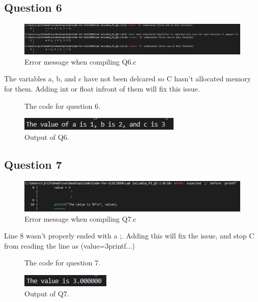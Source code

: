 \documentclass{article}
\begin{document}
\begin{flushleft}
  \subsection{Question 6}
  \begin{figure}[!ht]
    \centering
    \includegraphics[width=\linewidth]{Q6-error.png}
    \caption{Error message when compiling Q6.c}
  \end{figure}
  The variables a, b, and c have not been delcared so C hasn't allocated memory for them. Adding int or float infront of them will fix this issue.
  \begin{figure}[!ht]
    \centering
    
    \caption{The code for question 6.}
  \end{figure}
  \begin{figure}[!ht]
    \centering
    \includegraphics[width=\linewidth]{Q6-output.png}
    \caption{Output of Q6.}
  \end{figure}
  \subsection{Question 7}
  \begin{figure}[!ht]
    \centering
    \includegraphics[width=\linewidth]{Q7-error.png}
    \caption{Error message when compiling Q7.c}
  \end{figure}
  Line 8 wasn't properly ended with a ;. Adding this will fix the issue, and stop C from reading the line as (value=3printf...)
  \begin{figure}[!ht]
    \centering
    
    \caption{The code for question 7.}
  \end{figure}
  \begin{figure}[!ht]
    \centering
    \includegraphics[width=\linewidth]{Q7-output.png}
    \caption{Output of Q7.}
  \end{figure}

\end{flushleft}
\end{document}
